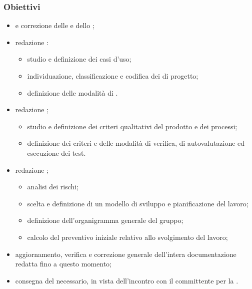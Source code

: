         \subsubsection{Obiettivi}
            \begin{itemize}
                \item {} e correzione delle \NdP{} e dello \SdF{};
                \item redazione \AdR{}:
                \begin{itemize}
                    \item studio e definizione dei casi d'uso;
                    \item individuazione, classificazione e codifica dei  di progetto;
                    \item definizione delle modalità di .
                \end{itemize}
                \item redazione \PdQ{};
                \begin{itemize}
                    \item studio e definizione dei criteri qualitativi del prodotto e dei processi;
                    \item definizione dei criteri e delle modalità di verifica, di autovalutazione ed esecuzione dei test.
                \end{itemize}
                \item redazione \PdP{};
                \begin{itemize}
                    \item analisi dei rischi;
                    \item scelta e definizione di un modello di sviluppo e pianificazione del lavoro;
                    \item definizione dell'organigramma generale del gruppo;
                    \item calcolo del preventivo iniziale relativo allo svolgimento del lavoro;
                \end{itemize}
                \item aggiornamento, verifica e correzione generale dell'intera documentazione redatta fino a questo momento;
                \item consegna del  necessario, in vista dell'incontro con il committente per la \RR{}.
            \end{itemize}
